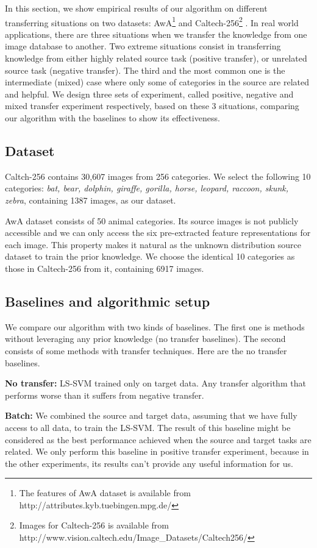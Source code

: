 In this section, we show empirical results of our algorithm on different transferring situations on two datasets: AwA\footnote{The features of AwA dataset is available from http://attributes.kyb.tuebingen.mpg.de/} \cite{lampert2009learning} and Caltech-256\footnote{Images for Caltech-256 is available from http://www.vision.caltech.edu/Image\_Datasets/Caltech256/} \cite{griffin2007caltech}. In real world applications, there are three situations when we transfer the knowledge from one image database to another. Two extreme situations consist in transferring knowledge from either highly related source task (positive transfer), or unrelated source task (negative transfer). The third and the most common one is the intermediate (mixed) case where only some of categories in the source are related and helpful. We design three sets of experiment, called positive, negative and mixed transfer experiment respectively, based on these 3 situations, comparing our algorithm with the baselines to show its effectiveness.
\subsection{Dataset}
Caltch-256 contains 30,607 images from 256 categories. We select the following 10 categories: \textit{bat, bear, dolphin, giraffe, gorilla, horse, leopard, raccoon, skunk, zebra}, containing 1387 images, as our dataset.

AwA dataset consists of 50 animal categories. Its source images is not publicly accessible and we can only access the six pre-extracted feature representations for each image. This property makes it natural as the unknown distribution source dataset to train the prior knowledge. We choose the identical 10 categories as those in Caltech-256 from it, containing 6917 images.

\subsection{Baselines and algorithmic setup}
We compare our algorithm with two kinds of baselines. The first one is methods without leveraging any prior knowledge (no transfer baselines). The second consists of some methods with transfer techniques. Here are the no transfer baselines.

\textbf{No transfer:} LS-SVM trained only on target data. Any transfer algorithm that performs worse than it suffers from negative transfer.

\textbf{Batch:} We combined the source and target data, assuming that we have fully access to all data, to train the LS-SVM. The result of this baseline might be considered as the best performance achieved when the source and target tasks are related. We only perform this baseline in positive transfer experiment, because in the other experiments, its results can't provide any useful information for us.

